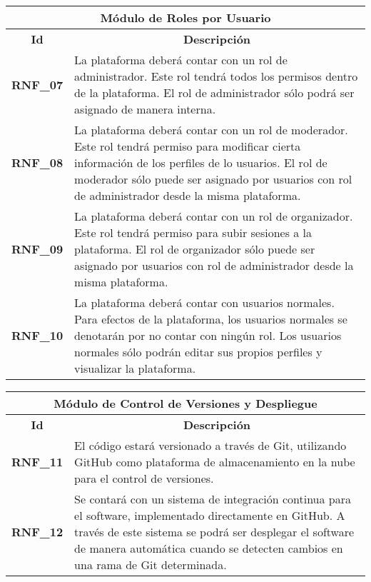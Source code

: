 \begin{center}
	\begin{tabular}{ | l | p{15cm} |}
		\hline
		\multicolumn{2}{|c|}{\textbf{Módulo de Roles por Usuario}} \\
		\hline
		\multicolumn{1}{|c|}{\textbf{Id}} & \multicolumn{1}{|c|}{\textbf{Descripción}} \\
		\hline
		{\textbf{RNF\_07}} & La plataforma deberá contar con un rol de administrador. Este rol tendrá todos los permisos dentro de la plataforma. El rol de administrador sólo podrá ser asignado de manera interna.\\ \hline
		
		{\textbf{RNF\_08}} & La plataforma deberá contar con un rol de moderador. Este rol tendrá permiso para modificar cierta información de los perfiles de lo usuarios. El rol de moderador sólo puede ser asignado por usuarios con rol de administrador desde  la misma plataforma.\\ \hline
		
		{\textbf{RNF\_09}} & La plataforma deberá contar con un rol de organizador. Este rol tendrá permiso para subir sesiones a la plataforma. El rol de organizador sólo puede ser asignado por usuarios con rol de administrador desde la misma plataforma. \\ \hline
		
		{\textbf{RNF\_10}} & La plataforma deberá contar con usuarios normales. Para efectos de la plataforma, los usuarios normales se denotarán por no contar con ningún rol. Los usuarios normales sólo podrán editar sus propios perfiles y visualizar la plataforma.\\ \hline
	\end{tabular}
\end{center}

\begin{center}
	\begin{tabular}{ | l | p{15cm} |}
		\hline
		\multicolumn{2}{|c|}{\textbf{Módulo de Control de Versiones y Despliegue}} \\
		\hline
		\multicolumn{1}{|c|}{\textbf{Id}} & \multicolumn{1}{|c|}{\textbf{Descripción}} \\
		\hline
		{\textbf{RNF\_11}} & El código estará versionado a través de Git, utilizando GitHub como plataforma de almacenamiento en la nube para el control de versiones.\\ \hline
		
		{\textbf{RNF\_12}} & Se contará con un sistema de integración continua para el software, implementado directamente en GitHub. A través de este sistema se podrá ser desplegar el software de manera automática cuando se detecten cambios en una rama de Git determinada.\\ \hline
	\end{tabular}
\end{center}

